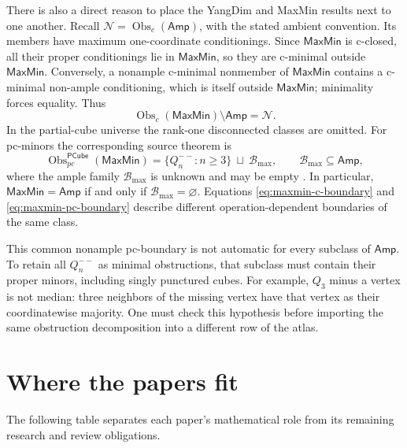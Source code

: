 \documentclass[11pt]{article}
\theoremstyle{definition}
\newcommand{\Amp}{\mathsf{Amp}}
\newcommand{\MaxMin}{\mathsf{MaxMin}}
\newcommand{\PCube}{\mathsf{PCube}}
\newcommand{\Obs}{\operatorname{Obs}}
\begin{document}
There is also a direct reason to place the YangDim and MaxMin results next
to one another. Recall $\mathcal N=\Obs_c(\Amp)$, with the stated
ambient convention. Its members have maximum one-coordinate conditionings.
Since $\MaxMin$ is c-closed, all their proper conditionings lie in
$\MaxMin$, so they are c-minimal outside $\MaxMin$. Conversely, a nonample
c-minimal nonmember of $\MaxMin$ contains a c-minimal non-ample conditioning,
which is itself outside $\MaxMin$; minimality forces equality. Thus
\begin{equation}\label{eq:maxmin-c-boundary}
 \Obs_c(\MaxMin)\setminus\Amp=\mathcal N.
\end{equation}
In the partial-cube universe the rank-one disconnected classes are omitted.
For pc-minors the corresponding source theorem is
\begin{equation}\label{eq:maxmin-pc-boundary}
 \Obs_{pc}^{\PCube}(\MaxMin)
 =\{Q_n^{--}:n\ge3\}\ \sqcup\ \mathcal B_{\max},
 \qquad \mathcal B_{\max}\subseteq\Amp,
\end{equation}
where the ample family $\mathcal B_{\max}$ is unknown and may be empty
\cite{Partition}. In particular, $\MaxMin=\Amp$ if and only if
$\mathcal B_{\max}=\varnothing$. Equations \eqref{eq:maxmin-c-boundary}
and \eqref{eq:maxmin-pc-boundary} describe different operation-dependent
boundaries of the same class.

This common nonample pc-boundary is not automatic for every subclass of
$\Amp$. To retain all $Q_n^{--}$ as minimal obstructions, that subclass
must contain their proper minors, including singly punctured cubes.
For example, $Q_3$ minus a vertex is not median: three neighbors of the
missing vertex have that vertex as their coordinatewise majority. One must
check this hypothesis before importing the same obstruction decomposition
into a different row of the atlas.



\section{Where the papers fit}\label{sec:papers}

The following table separates each paper's mathematical role from its
remaining research and review obligations.
\end{document}
